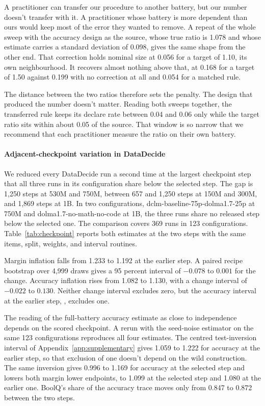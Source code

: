 A practitioner can transfer our procedure to another battery, but our number doesn't transfer with it. A practitioner whose battery is more dependent than ours would keep most of the error they wanted to remove. A repeat of the whole sweep with the accuracy design as the source, whose true ratio is 1.078 and whose estimate carries a standard deviation of 0.098, gives the same shape from the other end. That correction holds nominal size at 0.056 for a target of 1.10, its own neighbourhood. It recovers almost nothing above that, at 0.168 for a target of 1.50 against 0.199 with no correction at all and 0.054 for a matched rule.

The distance between the two ratios therefore sets the penalty. The design that produced the number doesn't matter. Reading both sweeps together, the transferred rule keeps its declare rate between 0.04 and 0.06 only while the target ratio sits within about 0.05 of the source. That window is so narrow that we recommend that each practitioner measure the ratio on their own battery.


\paragraph{Adjacent-checkpoint variation in DataDecide}
\label{app:checkpoint}
We reduced every DataDecide run a second time at the largest checkpoint step that all three runs in its configuration share below the selected step. The gap is 1,250 steps at 530M and 750M, between 657 and 1,250 steps at 150M and 300M, and 1,869 steps at 1B. In two configurations, dclm-baseline-75p-dolma1.7-25p at 750M and dolma1.7-no-math-no-code at 1B, the three runs share no released step below the selected one. The comparison covers 369 runs in 123 configurations. Table~\ref{tab:checkpoint} reports both estimates at the two steps with the same items, split, weights, and interval routines.

Margin inflation falls from 1.233 to 1.192 at the earlier step. A paired recipe bootstrap over 4,999 draws gives a 95 percent interval of $-0.078$ to $0.001$ for the change. Accuracy inflation rises from 1.082 to 1.130, with a change interval of $-0.022$ to $0.130$. Neither change interval excludes zero, but the accuracy interval at the earlier step, , excludes one.

The reading of the full-battery accuracy estimate as close to independence depends on the scored checkpoint. A rerun with the seed-noise estimator on the same 123 configurations reproduces all four estimates. The centred test-inversion interval of Appendix~\ref{app:supplementary} gives 1.059 to 1.222 for accuracy at the earlier step, so that exclusion of one doesn't depend on the wild construction. The same inversion gives 0.996 to 1.169 for accuracy at the selected step and lowers both margin lower endpoints, to 1.099 at the selected step and 1.080 at the earlier one. BoolQ's share of the accuracy trace moves only from 0.847 to 0.872 between the two steps.

